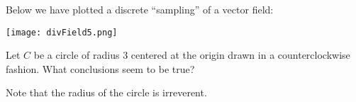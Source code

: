 \documentclass{ximera}
\begin{document}
\begin{exercise}
  Below we have plotted a discrete ``sampling'' of a vector field:
  \begin{image}
    \texttt{[image: divField5.png]}
  \end{image}
  Let $C$ be a circle of radius $3$ centered at the origin drawn in a
  counterclockwise fashion.  What conclusions seem to be true?
  \begin{selectAll}
  \end{selectAll}
  \begin{hint}
    Note that the radius of the circle is irreverent. 
  \end{hint}
\end{exercise}
\end{document}
